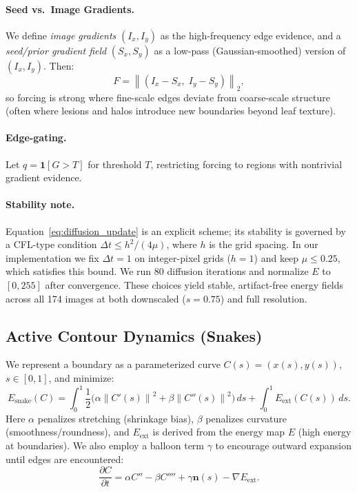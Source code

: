 \documentclass[journal]{IEEEtran}
\newcommand{\grad}{\nabla}
\newcommand{\norm}[1]{\left\lVert #1 \right\rVert}
\begin{document}
\paragraph{Seed vs.\ Image Gradients.}
We define \emph{image gradients} $(I_x,I_y)$ as the high-frequency edge evidence, and a \emph{seed/prior gradient field} $(S_x,S_y)$ as a low-pass (Gaussian-smoothed) version of $(I_x,I_y)$. Then:
\begin{equation}
F = \norm{(I_x-S_x,\; I_y-S_y)}_2,
\end{equation}
so forcing is strong where fine-scale edges deviate from coarse-scale structure (often where lesions and halos introduce new boundaries beyond leaf texture).

\paragraph{Edge-gating.}
Let $q = \mathbf{1}[G > T]$ for threshold $T$, restricting forcing to regions with nontrivial gradient evidence.

\paragraph{Stability note.}
Equation~\eqref{eq:diffusion_update} is an explicit scheme; its stability is governed by a CFL-type condition $\Delta t \leq h^2/(4\mu)$, where $h$ is the grid spacing. In our implementation we fix $\Delta t = 1$ on integer-pixel grids ($h=1$) and keep $\mu\leq 0.25$, which satisfies this bound. We run 80 diffusion iterations and normalize $E$ to $[0,255]$ after convergence. These choices yield stable, artifact-free energy fields across all 174 images at both downscaled ($s{=}0.75$) and full resolution.

\subsection{Active Contour Dynamics (Snakes)}
We represent a boundary as a parameterized curve $C(s) = (x(s), y(s))$, $s\in[0,1]$, and minimize:
\begin{equation}
E_{\mathrm{snake}}(C) = \int_0^1 \frac{1}{2}\Big(\alpha \norm{C'(s)}^2 + \beta \norm{C''(s)}^2\Big)\,ds + \int_0^1 E_{\mathrm{ext}}(C(s))\,ds.
\end{equation}
Here $\alpha$ penalizes stretching (shrinkage bias), $\beta$ penalizes curvature (smoothness/roundness), and $E_{\mathrm{ext}}$ is derived from the energy map $E$ (high energy at boundaries). We also employ a balloon term $\gamma$ to encourage outward expansion until edges are encountered:
\begin{equation}
\frac{\partial C}{\partial t} = \alpha C'' - \beta C'''' + \gamma \mathbf{n}(s) - \grad E_{\mathrm{ext}}.
\end{equation}
\end{document}
